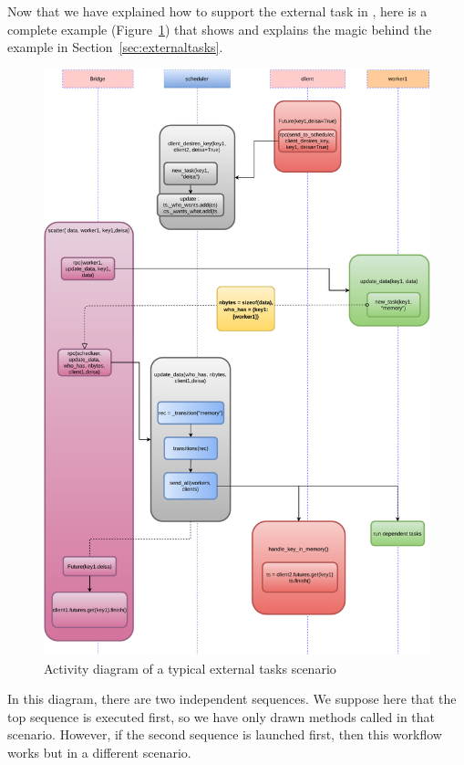 Now that we have explained how to support the external task in \dask, here is a complete example (Figure~\ref{figscatterDA}) that shows and explains the magic behind the example in Section~\ref{sec:externaltasks}. 

\begin{figure}\centering
\includegraphics[scale=0.65]{figures/NewScatterDiagramAtcivity.pdf}
\caption{Activity diagram of a typical external tasks scenario}
\label{figscatterDA}
\end{figure}

In this diagram, there are two independent sequences. We suppose here that the top sequence is executed first, so we have only drawn methods called in that scenario. However, if the second sequence is launched first, then this workflow works but in a different scenario. 

